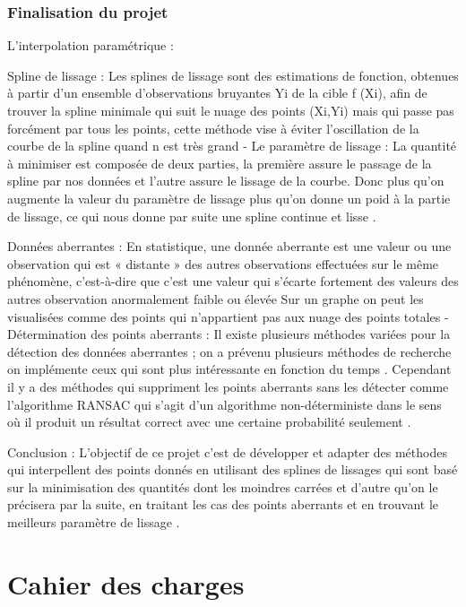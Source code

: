\documentclass[a4paper,10pt]{article} %
\begin{document}
\subsubsection*{Finalisation du projet}

 L’interpolation paramétrique :
             
Spline de lissage :
            Les splines de lissage sont des estimations de fonction, obtenues à partir d'un ensemble d'observations bruyantes Yi de la cible f (Xi), afin de trouver la spline minimale qui suit le nuage des points (Xi,Yi) mais qui passe pas forcément par tous les points, cette méthode vise à éviter l’oscillation de la courbe de la spline quand n est très grand   
-          Le paramètre de lissage  :
            La quantité à minimiser est composée de deux parties, la première assure le passage de la spline par nos données  et l’autre assure le lissage  de la courbe. Donc plus qu’on augmente la valeur du paramètre de lissage plus qu’on donne un poid à la partie de lissage, ce qui nous donne par suite une spline continue et lisse .
 
Données aberrantes :   
            En statistique, une donnée aberrante est une valeur ou une observation qui est « distante » des autres observations effectuées sur le même phénomène, c'est-à-dire que c’est une valeur qui s'écarte fortement des valeurs des autres observation anormalement faible ou élevée
                Sur un graphe on peut les visualisées comme des points qui n’appartient pas aux nuage des points totales
-          Détermination des points aberrants   :
Il existe plusieurs  méthodes variées pour la détection des données aberrantes ; on a prévenu plusieurs méthodes de recherche on implémente ceux qui sont plus intéressante en fonction du temps .
                Cependant  il y a des méthodes qui suppriment les points aberrants sans les détecter comme l’algorithme RANSAC qui s'agit d'un algorithme non-déterministe dans le sens où il produit un résultat correct avec une certaine probabilité seulement .
 
Conclusion :
            L’objectif de ce projet c’est de développer et adapter  des méthodes qui interpellent des points donnés en utilisant des splines de lissages qui sont basé sur la minimisation des 
quantités dont les  moindres carrées et d’autre qu’on le précisera par la suite, en traitant les cas des points aberrants et en trouvant  le meilleurs paramètre de lissage  .



\section{Cahier des charges}
\end{document}

